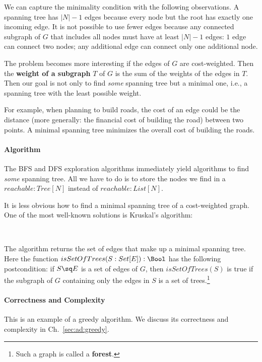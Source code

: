 We can capture the minimality condition with the following observations.
A spanning tree has $|N|-1$ edges because every node but the root has exactly one incoming edge.
It is not possible to use fewer edges because any connected subgraph of $G$ that includes all nodes must have at least $|N|-1$ edges: $1$ edge can connect two nodes; any additional edge can connect only one additional node.

The problem becomes more interesting if the edges of $G$ are cost-weighted.
Then the \textbf{weight of a subgraph} $T$ of $G$ is the sum of the weights of the edges in $T$.
Then our goal is not only to find \emph{some} spanning tree but a minimal one, i.e., a spanning tree with the least possible weight.

For example, when planning to build roads, the cost of an edge could be the distance (more generally: the financial cost of building the road) between two points.
A minimal spanning tree minimizes the overall cost of building the roads.

\paragraph{Algorithm}
The BFS and DFS exploration algorithms immediately yield algorithms to find \emph{some} spanning tree.
All we have to do is to store the nodes we find in a $reachable: Tree[N]$ instead of $reachable:List[N]$.

It is less obvious how to find a minimal spanning tree of a cost-weighted graph.
One of the most well-known solutions is Kruskal's algorithm:

\begin{acode}
\\
\end{acode}
The algorithm returns the set of edges that make up a minimal spanning tree.
Here the function $isSetOfTrees(S: Set[E]):\Bool$ has the following postcondition: if $S\sq E$ is a set of edges of $G$, then $isSetOfTrees(S)$ is true if the subgraph of $G$ containing only the edges in $S$ is a set of trees.\footnote{Such a graph is called a \textbf{forest}.}

\paragraph{Correctness and Complexity}
This is an example of a greedy algorithm.
We discuss its correctness and complexity in Ch.~\ref{sec:ad:greedy}.

